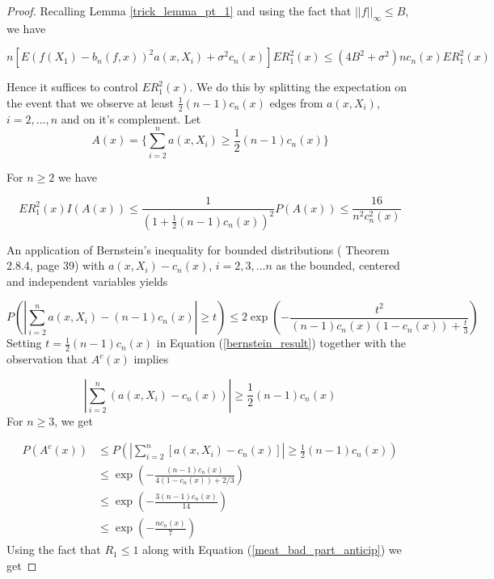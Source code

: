 \documentclass{article}
\begin{document}
\begin{proof}
Recalling Lemma \ref{trick_lemma_pt_1} and using the fact that $||f||_{\infty}\leq B$, we have 


\begin{equation}
\label{ubv_1}
     n[E(f(X_1)-b_n(f,x))^2a(x,X_i)+\sigma^2c_n(x)]ER_1^2(x)
     \leq (4B^2+\sigma^2)nc_n(x)ER^2_1(x)
\end{equation}

Hence it suffices to control $ER_1^2(x)$. We do this by splitting the expectation on the event that we observe at least $\frac{1}{2}(n-1)c_n(x)$ edges from $a(x,X_i)$, $i=2,...,n$ and on it's complement. Let 
\begin{equation}
    A(x)=\{\sum_{i=2}^na(x,X_i)\geq \frac{1}{2}(n-1)c_n(x)\}
\end{equation}

For $n\geq 2$ we have

\begin{equation}
\label{meat_good_part}
ER_1^2(x)I(A(x))\leq \frac{1}{(1+\frac{1}{2}(n-1)c_n(x))^2}P(A(x))\leq \frac{16}{n^2c_n^2(x)}
\end{equation}

An application of Bernstein's inequality for bounded distributions (\cite{vershynin} Theorem 2.8.4, page 39) with $a(x,X_i)-c_n(x)$, $i=2,3,...n$ as the bounded, centered and independent variables yields

\begin{equation}
\label{bernstein_result}
P(|\sum_{i=2}^{n}a(x,X_i)-(n-1)c_n(x)|\geq t)\leq 2\exp{(-\frac{t^2}{(n-1)c_n(x)(1-c_n(x))+\frac{t}{3}})}
\end{equation}
Setting $t=\frac{1}{2}(n-1)c_n(x)$ in Equation (\ref{bernstein_result}) together with the observation that $A^c(x)$ implies 

\begin{equation*}
    |\sum_{i=2}^{n}(a(x,X_i)-c_n(x))|\geq \frac{1}{2}(n-1)c_n(x)
\end{equation*}
For $n\geq 3$, we get

\begin{equation}
\label{meat_bad_part_anticip}
\begin{split}
    P(A^c(x))&\leq P(|\sum_{i=2}^{n}[a(x,X_i)-c_n(x)]|\geq \frac{1}{2}(n-1)c_n(x))\\
    &\leq \exp(-\frac{(n-1)c_n(x)}{4(1-c_n(x))+2/3})\\
    &\leq \exp(-\frac{3(n-1)c_n(x)}{14})\\
    &\leq \exp(-\frac{nc_n(x)}{7})
\end{split}
\end{equation}
Using the fact that $R_1\leq 1$ along with Equation (\ref{meat_bad_part_anticip}) we get


\end{proof}
\end{document}
